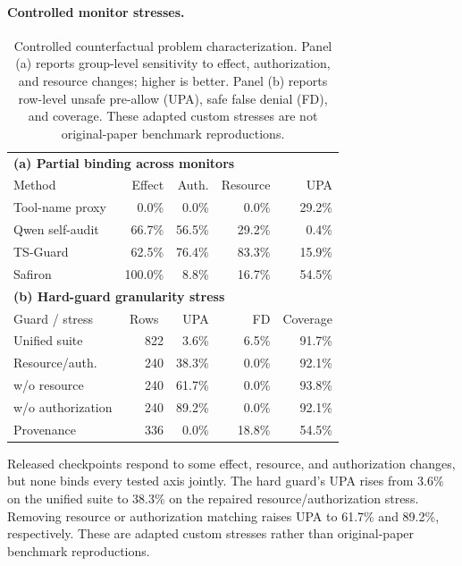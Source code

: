 \documentclass[letterpaper,twocolumn,10pt]{article}
\theoremstyle{definition}
\begin{document}
\paragraph{Controlled monitor stresses.}
\begin{table}[t]
\centering
\footnotesize
\setlength{\tabcolsep}{3.5pt}
\caption{Controlled counterfactual problem characterization. Panel (a) reports
group-level sensitivity to effect, authorization, and resource changes; higher
is better. Panel (b) reports row-level unsafe pre-allow (UPA), safe false denial
(FD), and coverage. These adapted custom stresses are not original-paper
benchmark reproductions.}
\label{tab:binding-problem-characterization}
\begin{tabular}{lrrrr}
\toprule
\multicolumn{5}{l}{\textbf{(a) Partial binding across monitors}} \\
Method & Effect & Auth. & Resource & UPA \\
\midrule
Tool-name proxy & 0.0\% & 0.0\% & 0.0\% & 29.2\% \\
Qwen self-audit & 66.7\% & 56.5\% & 29.2\% & 0.4\% \\
TS-Guard & 62.5\% & 76.4\% & 83.3\% & 15.9\% \\
Safiron & 100.0\% & 8.8\% & 16.7\% & 54.5\% \\
\midrule
\multicolumn{5}{l}{\textbf{(b) Hard-guard granularity stress}} \\
Guard / stress & \multicolumn{1}{c}{Rows} & UPA & FD & Coverage \\
\midrule
Unified suite & 822 & 3.6\% & 6.5\% & 91.7\% \\
Resource/auth. & 240 & 38.3\% & 0.0\% & 92.1\% \\
\quad w/o resource & 240 & 61.7\% & 0.0\% & 93.8\% \\
\quad w/o authorization & 240 & 89.2\% & 0.0\% & 92.1\% \\
Provenance & 336 & 0.0\% & 18.8\% & 54.5\% \\
\bottomrule
\end{tabular}
\end{table}

Released checkpoints respond to some effect, resource, and authorization
changes, but none binds every tested axis jointly.  The hard guard's UPA rises
from 3.6\% on the unified suite to 38.3\% on the repaired resource/authorization
stress.  Removing resource or authorization matching raises UPA to 61.7\% and
89.2\%, respectively.  These are adapted custom stresses rather than
original-paper benchmark reproductions.
\end{document}
